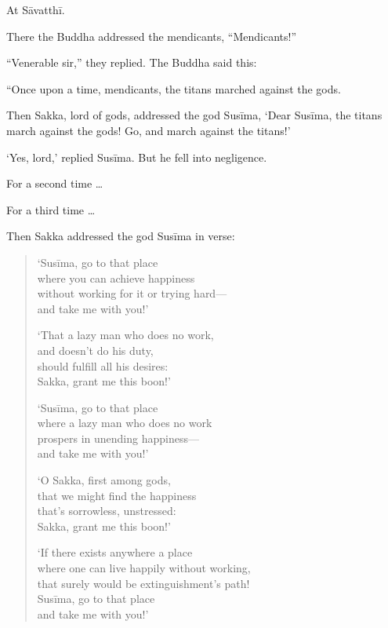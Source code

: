\documentclass[12pt,openany]{book}%
\begin{document}
At \textsanskrit{Sāvatthī}. 

There the Buddha addressed the mendicants, “Mendicants!” 

“Venerable sir,” they replied. The Buddha said this: 

“Once upon a time, mendicants, the titans marched against the gods. 

Then Sakka, lord of gods, addressed the god \textsanskrit{Susīma}, ‘Dear \textsanskrit{Susīma}, the titans march against the gods! Go, and march against the titans!’ 

‘Yes, lord,’ replied \textsanskrit{Susīma}. But he fell into negligence. 

For a second time … 

For a third time … 

Then Sakka addressed the god \textsanskrit{Susīma} in verse: 

\begin{verse}%
‘\textsanskrit{Susīma}, go to that place \\
where you can achieve happiness \\
without working for it or trying hard—\\
and take me with you!’ 

‘That a lazy man who does no work, \\
and doesn’t do his duty, \\
should fulfill all his desires: \\
Sakka, grant me this boon!’ 

‘\textsanskrit{Susīma}, go to that place \\
where a lazy man who does no work \\
prospers in unending happiness—\\
and take me with you!’ 

‘O Sakka, first among gods, \\
that we might find the happiness \\
that’s sorrowless, unstressed: \\
Sakka, grant me this boon!’ 

‘If there exists anywhere a place \\
where one can live happily without working, \\
that surely would be extinguishment’s path! \\
\textsanskrit{Susīma}, go to that place \\
and take me with you!’ 

%
\end{verse}
\end{document}

